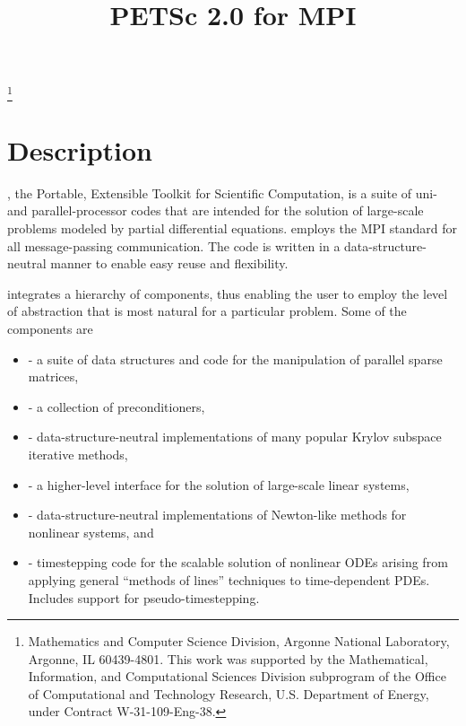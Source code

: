 \pagestyle{empty}

\pagestyle{empty}
\title{PETSc 2.0 for MPI}
\thanks{Mathematics and Computer Science Division,
Argonne National Laboratory,
Argonne, IL 60439-4801.
This work was supported by the Mathematical,
        Information, and Computational Sciences Division subprogram of
        the Office of Computational and Technology Research,
        U.S. Department of Energy, under Contract W-31-109-Eng-38.}

\date{}
\maketitle

\newcommand{\vsp}{\vspace{-1.5mm}}


\section*{Description}

, the Portable, Extensible Toolkit for Scientific Computation,
is a suite of uni- and parallel-processor codes that are intended for
the solution of large-scale problems modeled by partial differential
equations.   employs the MPI standard for all
message-passing communication.  The code is written in a
data-structure-neutral manner to enable easy reuse and flexibility.

 integrates a hierarchy of components, thus
enabling the user to employ the level of abstraction that is most
natural for a particular problem.  Some of the components are
\vspace{-.4cm}
\begin{itemize}
\item {} - a suite of data structures and code
      for the manipulation of parallel sparse matrices,
\vsp
\item {} - a collection of preconditioners,
\vsp
\item {} - data-structure-neutral implementations of
      many popular Krylov subspace iterative methods,
\vsp
\item {} - a higher-level interface for the solution of
      large-scale linear systems,
\vsp
\item {} - data-structure-neutral implementations of Newton-like
      methods for nonlinear systems, and
\vsp
\item {} - timestepping code for the scalable solution of
      nonlinear ODEs arising from applying general ``methods of lines'' 
      techniques to time-dependent PDEs. Includes support for 
      pseudo-timestepping. 
\end{itemize}
\vsp

